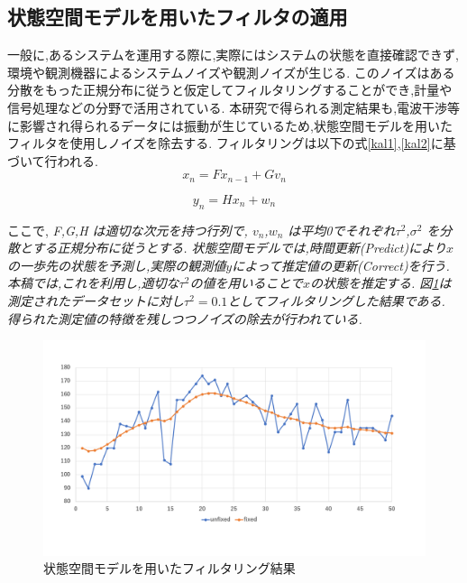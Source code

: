 \subsection{状態空間モデルを用いたフィルタの適用}
一般に,あるシステムを運用する際に,実際にはシステムの状態を直接確認できず,環境や観測機器によるシステムノイズや観測ノイズが生じる.
このノイズはある分散をもった正規分布に従うと仮定してフィルタリングすることができ,計量や信号処理などの分野で活用されている.
本研究で得られる測定結果も,電波干渉等に影響され得られるデータには振動が生じているため,状態空間モデルを用いたフィルタを使用しノイズを除去する.
フィルタリングは以下の式\ref{kal1},\ref{kal2}に基づいて行われる.
\begin{equation}
 \label{kal1}
 x_n = Fx_{n-1} + Gv_n 
\end{equation}

\begin{equation}
  \label{kal2}
  y_n = Hx_n + w_n
\end{equation}

ここで,
\it
F,G,H
\rm
は適切な次元を持つ行列で,
\it
$v_n$,$w_n$
\rm
は平均0でそれぞれ$\tau^2$,$\sigma^2$
を分散とする正規分布に従うとする.\cite{TSSS}
状態空間モデルでは,時間更新(Predict)により$x$の一歩先の状態を予測し,実際の観測値$y$によって推定値の更新(Correct)を行う.\cite{kalman}
本稿では,これを利用し,適切な$\tau^2$の値を用いることで$x$の状態を推定する.
図\ref{kalman}は測定されたデータセットに対し$\tau^2 = 0.1$としてフィルタリングした結果である.
得られた測定値の特徴を残しつつノイズの除去が行われている.

\clearpage
\begin{figure}[!t]
  \centering
  \includegraphics[width = 15cm, bb= 0 0 1000 500]{chapter3/kalman.png}
  \caption{状態空間モデルを用いたフィルタリング結果}
  \label{kalman}
\end{figure}



